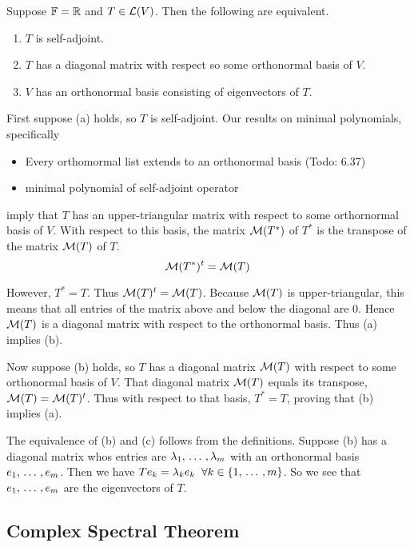 \begin{thm}
  Suppose $\mathbb{F} = \mathbb{R}$ and $T \in \mathcal{L} (V)$. Then the following are equivalent.
  \begin{enumerate}[label=\textbf{(\alph*)}]
    \item $T$ is self-adjoint.
    \item $T$ has a diagonal matrix with respect so some orthonormal basis of $V$.
    \item $V$ has an orthonormal basis consisting of eigenvectors of $T$.
  \end{enumerate}
\end{thm}
\begin{prf}
   First suppose (a) holds, so $T$ is self-adjoint. Our results on minimal polynomials, specifically
  \begin{itemize}
    \item Every orthomormal list extends to an orthonormal basis (Todo: 6.37)
    \item minimal polynomial of self-adjoint operator
  \end{itemize}

  imply that $T$ has an upper-triangular matrix with respect to some orthornormal basis of $V$. With respect to this basis, the matrix $\mathcal{M}(T^*)$ of $T^*$ is the transpose of the matrix $\mathcal{M}(T)$ of $T$.
  \[
  \mathcal{M}(T^*)^t = \mathcal{M}(T)
  \]

  However, $T^*=T$. Thus $\mathcal{M}(T)^t=\mathcal{M}(T)$. Because $\mathcal{M}(T)$ is upper-triangular, this means that all entries of the matrix above and below the diagonal are $0$. Hence $\mathcal{M}(T)$  is a diagonal matrix with respect to the orthonormal basis. Thus (a) implies (b).

   Now suppose (b) holds, so $T$ has a diagonal matrix $\mathcal{M}(T)$ with respect to some orthonormal basis of $V$. That diagonal matrix $\mathcal{M}(T)$ equals its transpose, $\mathcal{M}(T)= \mathcal{M}(T)^t$. Thus with respect to that basis, $T^*=T$, proving that (b) implies (a).

   The equivalence of (b) and (c) follows from the definitions. Suppose (b) has a diagonal matrix whos entries are $\lambda_1, {\, \ldots \,\,}, \lambda_m$ with an orthonormal basis $e_1, {\, \ldots \,\,}, e_m$. Then we have $Te_k = \lambda_k e_k \; \; \forall k \in \{1, {\, \ldots \,\,}, m\}$. So we see that $e_1, {\, \ldots \,\,}, e_m$ are the eigenvectors of $T$.
\end{prf}

\subsection{Complex Spectral Theorem}

